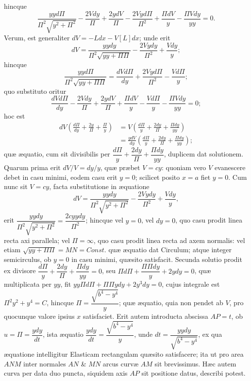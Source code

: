hincque
\[\frac{yyd\Pi}{\Pi^2\sqrt{y^2+\Pi^2}}-\frac{2Vdy}{\Pi}+\frac{2ydV}{\Pi}-\frac{2Vyd\Pi}{\Pi^2}+\frac{\Pi dV}{y}-\frac{\Pi Vdy}{yy}=0.\]
Verum, est generaliter $dV=-Ldx-V[L]dx$; unde erit
\[dV=\frac{yydy}{\Pi^2\sqrt{yy+\Pi\Pi}}-\frac{2Vydy}{\Pi^2}+\frac{Vdy}{y};\]
hincque
\[\frac{yyd\Pi}{\Pi^2\sqrt{yy+\Pi\Pi}}=\frac{dVd\Pi}{dy}+\frac{2Vyd\Pi}{\Pi^2}-\frac{Vd\Pi}{y};\]
quo substituto oritur
\[\frac{dVd\Pi}{dy}-\frac{2Vdy}{\Pi}+\frac{2ydV}{\Pi}+\frac{\Pi dV}{y}-\frac{Vd\Pi}{y}-\frac{\Pi Vdy}{yy}=0;\]
hoc est
\[\begin{aligned}dV\left(\frac{d\Pi}{dy}+\frac{2y}{\Pi}+\frac{\Pi}{y}\right)&=V\left(\frac{d\Pi}{y}+\frac{2dy}{\Pi}+\frac{\Pi dy}{yy}\right)\\&=\frac{ydV}{dy}\left(\frac{d\Pi}{y}+\frac{2dy}{\Pi}+\frac{\Pi dy}{yy}\right);\end{aligned}\]
quæ æquatio, cum sit divisibilis per $\dfrac{d\Pi}{y}+\dfrac{2dy}{\Pi}+\dfrac{\Pi dy}{yy}$, duplicem dat solutionem. Quarum prima erit $dV/V=dy/y$, quæ præbet $V=cy$: quoniam vero $V$ evanescere debet in casu minimi, eodem casu erit $y=0$; scilicet posito $x=a$ fiet $y=0$. Cum nunc sit $V=cy$, facta substitutione in æquatione
\[dV=\frac{yydy}{\Pi^2\sqrt{y^2+\Pi^2}}-\frac{2Vydy}{\Pi^2}+\frac{Vdy}{y},\]
erit $\dfrac{yydy}{\Pi^2\sqrt{y^2+\Pi^2}}=\dfrac{2cyydy}{\Pi^2}$; hincque vel $y=0$, vel $dy=0$, quo casu prodit linea recta axi parallela; vel $\Pi=\infty$, quo casu prodit linea recta ad axem normalis: vel etiam $\sqrt{yy+\Pi\Pi}=MN=\mathit{Const.}$ quæ æquatio dat Circulum; atque integer semicirculus, ob $y=0$ in casu minimi, quæsito satisfacit. Secunda solutio prodit ex divisore $\dfrac{d\Pi}{y}+\dfrac{2dy}{\Pi}+\dfrac{\Pi dy}{yy}=0$, seu $\Pi d\Pi+\dfrac{\Pi\Pi dy}{y}+2ydy=0$, quæ multiplicata per $yy$, fit $yy\Pi d\Pi+\Pi\Pi ydy+2y^3dy=0$, cujus integrale est $\Pi^2y^2+y^4=C$, hincque $\Pi=\dfrac{\sqrt{b^4-y^4}}{y}$; quæ æquatio, quia non pendet ab $V$, pro quocunque valore ipsius $x$ satisfaciet. Erit autem introducta abscissa $AP=t$, ob $u=\Pi=\dfrac{ydy}{dt}$, ista æquatio $\dfrac{ydy}{dt}=\dfrac{\sqrt{b^4-y^4}}{y}$, unde $dt=\dfrac{yydy}{\sqrt{b^4-y^4}}$, ex qua æquatione intelligitur Elasticam rectangulam quæsito satisfacere; ita ut pro area $ANM$ inter normales $AN$ \& $MN$ arcus curvæ $AM$ sit brevissimus. Hæc autem curva per data duo puncta, siquidem axis $AP$ sit positione datus, describi potest.
